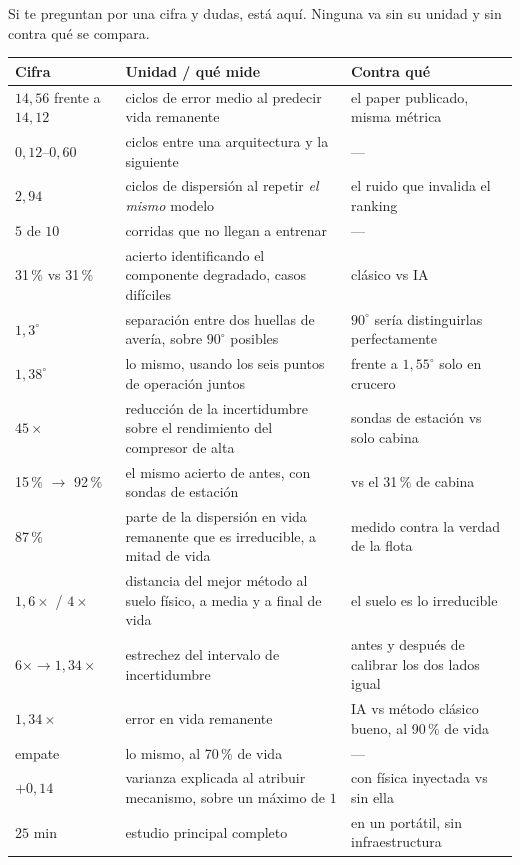 \documentclass[11pt,a4paper]{article}
\begin{document}
Si te preguntan por una cifra y dudas, está aquí. Ninguna va sin su unidad y sin contra
qué se compara.

\begin{center}\small
\begin{tabular}{@{}p{}p{}p{}@{}}
  \toprule
  Cifra & Unidad / qué mide & Contra qué \\
  \midrule
  $14{,}56$ frente a $14{,}12$ & ciclos de error medio al predecir vida remanente & el paper publicado, misma métrica \\
  $0{,}12$--$0{,}60$ & ciclos entre una arquitectura y la siguiente & --- \\
  $2{,}94$ & ciclos de dispersión al repetir \emph{el mismo} modelo & el ruido que invalida el ranking \\
  $5$ de $10$ & corridas que no llegan a entrenar & --- \\
  31\,\% vs 31\,\% & acierto identificando el componente degradado, casos difíciles & clásico vs IA \\
  $1{,}3^{\circ}$ & separación entre dos huellas de avería, sobre $90^{\circ}$ posibles & $90^{\circ}$ sería distinguirlas perfectamente \\
  $1{,}38^{\circ}$ & lo mismo, usando los seis puntos de operación juntos & frente a $1{,}55^{\circ}$ solo en crucero \\
  $45\times$ & reducción de la incertidumbre sobre el rendimiento del compresor de alta & sondas de estación vs solo cabina \\
  15\,\% $\to$ 92\,\% & el mismo acierto de antes, con sondas de estación & vs el 31\,\% de cabina \\
  87\,\% & parte de la dispersión en vida remanente que es irreducible, a mitad de vida & medido contra la verdad de la flota \\
  $1{,}6\times$ / $4\times$ & distancia del mejor método al suelo físico, a media y a final de vida & el suelo es lo irreducible \\
  $6\times \to 1{,}34\times$ & estrechez del intervalo de incertidumbre & antes y después de calibrar los dos lados igual \\
  $1{,}34\times$ & error en vida remanente & IA vs método clásico bueno, al 90\,\% de vida \\
  empate & lo mismo, al 70\,\% de vida & --- \\
  $+0{,}14$ & varianza explicada al atribuir mecanismo, sobre un máximo de $1$ & con física inyectada vs sin ella \\
  $25$ min & estudio principal completo & en un portátil, sin infraestructura \\
  \bottomrule
\end{tabular}
\end{center}
\end{document}

